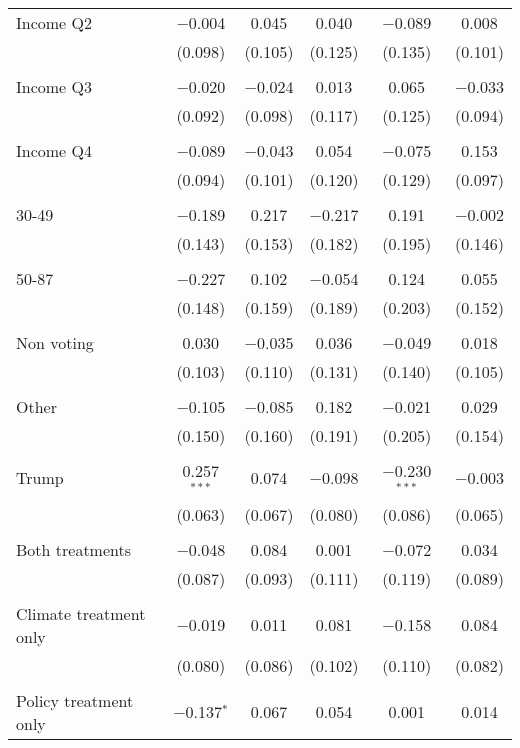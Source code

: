 \begin{tabular}{@{\extracolsep{5pt}}lccccc}
 Income Q2 & $-$0.004 & 0.045 & 0.040 & $-$0.089 & 0.008 \\ 
  & (0.098) & (0.105) & (0.125) & (0.135) & (0.101) \\ 
  & & & & & \\ 
 Income Q3 & $-$0.020 & $-$0.024 & 0.013 & 0.065 & $-$0.033 \\ 
  & (0.092) & (0.098) & (0.117) & (0.125) & (0.094) \\ 
  & & & & & \\ 
 Income Q4 & $-$0.089 & $-$0.043 & 0.054 & $-$0.075 & 0.153 \\ 
  & (0.094) & (0.101) & (0.120) & (0.129) & (0.097) \\ 
  & & & & & \\ 
 30-49 & $-$0.189 & 0.217 & $-$0.217 & 0.191 & $-$0.002 \\ 
  & (0.143) & (0.153) & (0.182) & (0.195) & (0.146) \\ 
  & & & & & \\ 
 50-87 & $-$0.227 & 0.102 & $-$0.054 & 0.124 & 0.055 \\ 
  & (0.148) & (0.159) & (0.189) & (0.203) & (0.152) \\ 
  & & & & & \\ 
 Non voting & 0.030 & $-$0.035 & 0.036 & $-$0.049 & 0.018 \\ 
  & (0.103) & (0.110) & (0.131) & (0.140) & (0.105) \\ 
  & & & & & \\ 
 Other & $-$0.105 & $-$0.085 & 0.182 & $-$0.021 & 0.029 \\ 
  & (0.150) & (0.160) & (0.191) & (0.205) & (0.154) \\ 
  & & & & & \\ 
 Trump & 0.257$^{***}$ & 0.074 & $-$0.098 & $-$0.230$^{***}$ & $-$0.003 \\ 
  & (0.063) & (0.067) & (0.080) & (0.086) & (0.065) \\ 
  & & & & & \\ 
 Both treatments & $-$0.048 & 0.084 & 0.001 & $-$0.072 & 0.034 \\ 
  & (0.087) & (0.093) & (0.111) & (0.119) & (0.089) \\ 
  & & & & & \\ 
 Climate treatment only & $-$0.019 & 0.011 & 0.081 & $-$0.158 & 0.084 \\ 
  & (0.080) & (0.086) & (0.102) & (0.110) & (0.082) \\ 
  & & & & & \\ 
 Policy treatment only & $-$0.137$^{*}$ & 0.067 & 0.054 & 0.001 & 0.014 \\ 

\end{tabular}
